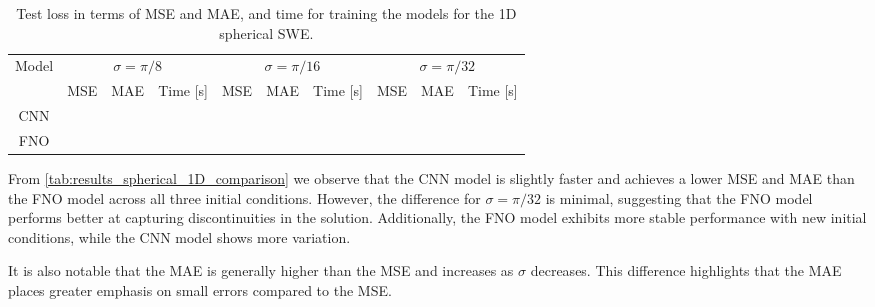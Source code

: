 \begin{table}[H]
    \centering
    \small %
    \begin{tabular}{c|ccc|ccc|ccc}
        \hline
        Model & \multicolumn{3}{c|}{$\sigma = \pi/8$} & \multicolumn{3}{c|}{$\sigma = \pi/16$} & \multicolumn{3}{c}{$\sigma = \pi/32$} \\
        \cline{2-10}
        & MSE & MAE & Time [s] & MSE & MAE & Time [s] & MSE & MAE & Time [s] \\
        \hline
        CNN & 
         &
         &
         &
         &
         &
         &
         &
         &
         
        \\ 
        \hline
        FNO & 
         &
         &
         &
         &
         &
         &
         &
         &
         
        \\ 
        \hline
    \end{tabular}
    \caption{Test loss in terms of MSE and MAE, and time for training the models for the 1D spherical SWE.}\label{tab:results_spherical_1D_comparison}
\end{table}
From \autoref{tab:results_spherical_1D_comparison} we observe that the CNN model is slightly faster and achieves a lower MSE and MAE than the FNO model across all three initial conditions.
However, the difference for $\sigma = \pi/32$ is minimal, suggesting that the FNO model performs better at capturing discontinuities in the solution.
Additionally, the FNO model exhibits more stable performance with new initial conditions, while the CNN model shows more variation.

It is also notable that the MAE is generally higher than the MSE and increases as $\sigma$ decreases.
This difference highlights that the MAE places greater emphasis on small errors compared to the MSE.

